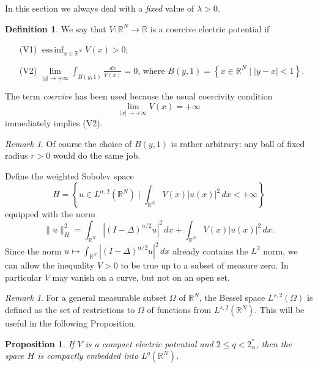 \documentclass[11pt]{amsart}
\numberwithin{equation}{section}
\newtheorem{proposition}[theorem]{Proposition}
\theoremstyle{remark}
\newtheorem{remark}[theorem]{Remark}
\theoremstyle{definition}
\newtheorem{definition}[theorem]{Definition}
\begin{document}
In this section we always deal with a \emph{fixed} value of $\lambda>0$.
%
\begin{definition}
  We say that $V \colon \mathbb{R}^N \to \mathbb{R}$ is a coercive
  electric potential if
\begin{itemize}
		\item[(V1)] $\operatorname{ess\,inf}_{x \in \mathbb{R}^N} V(x) > 0$;
		\item[(V2)]	$\lim\limits_{|y| \to +\infty} \int_{B(y,1)} \frac{dx}{V(x)}=0$, where $B(y,1) = \left\{ x \in \mathbb{R}^N \mid |y-x|<1 \right\}$.
\end{itemize}
\end{definition}
The term \emph{coercive} has been used because the usual coercivity condition
\[
\lim_{|x| \to +\infty} V(x) = +\infty
\]
immediately implies (V2).
\begin{remark}
	Of course the choice of $B(y,1)$ is rather arbitrary: any ball of fixed radius $r>0$ would do the same job.
\end{remark}
Define the weighted Sobolev space
\[
H = \left\{ u \in L^{\alpha,2}(\mathbb{R}^N) \mid \int_{\mathbb{R}^N} V(x) |u(x)|^2 \, dx < +\infty \right\}
\]
equipped with the norm
\[
\|u\|_H^2 = \int_{\mathbb{R}^N}
\left| (I-\Delta)^{\alpha/2} u \right|^2 \, dx + \int_{\mathbb{R}^N} V(x) |u(x)|^2 \, dx.
\]
Since the norm $u \mapsto \int_{\mathbb{R}^N} \left| (I-\Delta)^{\alpha/2} u \right|^2 \, dx$ already contains the $L^2$ norm, we can allow the inequality $V > 0$ to be true up to a subset of measure zero. In particular $V$ may vanish on a curve, but not on an open set.
% 
\begin{remark}
	For a general measurable subset $\Omega$ of $\mathbb{R}^N$, the Bessel space $L^{s,2}(\Omega)$ is defined as the set of restrictions to $\Omega$ of functions from $L^{s,2}(\mathbb{R}^N)$. This will be useful in the following Proposition.
\end{remark}
\begin{proposition} \label{prop:2.2}
	If $V$ is a compact electric potential and $2\leqslant q<2_\alpha^*$, then the space $H$ is compactly embedded into $L^q(\mathbb{R}^N)$.
\end{proposition}
\end{document}
